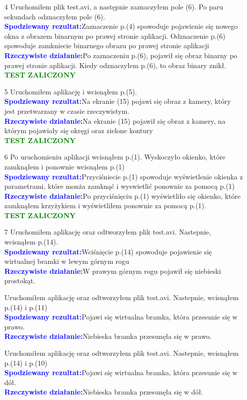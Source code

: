 \documentclass[11pt,a4paper]{article}
\newcommand{\testA}{\textcolor{blue}{\textbf{Spodziewany rezultat:\quad}}}
\newcommand{\testB}{\textcolor{blue}{\textbf{Rzeczywiste działanie:\quad}}}
\newcommand{\testT}{\textcolor{green}{\large{\textbf{TEST ZALICZONY}}}}
\newcommand{\testM}{\textcolor{purple}{\large{\textbf{TEST NIEJEDNOZNACZNY}}}}
\begin{document}
\begin{enumerate}
\testM

\item[4] Uruchomiłem plik test.avi, a następnie zaznaczyłem pole (6). Po paru sekundach odznaczyłem pole (6).\\
\testA Zaznaczenie p.(4) spowoduje pojawienie się nowego okna z obrazem binarnym po prawej stronie aplikacji. Odznaczenie p.(6) spowoduje zamkniecie binarnego obrazu po prawej stronie aplikacji\\
\testB Po zaznaczeniu p.(6), pojawił się obraz binarny po prawej stronie aplikacji. Kiedy odznaczyłem p.(6), to obraz binary znikł.\\
\testT
\item[5]  Uruchomiłem aplikację i wcisnąłem p.(5).\\
\testA Na ekranie (15) pojawi się obraz z kamery, który jest przetwarzany w czasie rzeczywistym.\\
\testB Na ekranie (15) pojawił się obraz z kamery, na którym pojawiały się okręgi oraz zielone kontury\\
\testT
\item[6] Po uruchomieniu aplikacji wcisnąłem p.(1). Wyskoczyło okienko, które zamknąłem i ponownie wcisnąłem p.(1)\\
\testA Przyciśniecie p.(1) spowoduje wyświetlenie okienka z parametrami, które monża zamknąć i wyswietlić ponownie za pomocą p.(1)\\
\testB Po przyciśnięciu p.(1) wyświetliło się okienko, które zamknąłem krzyżykiem i wyświetliłem ponownie za pomocą p.(1).\\
\testT
\item[7] Uruchomiłem aplikację oraz odtworzyłem plik test.avi. Nastepnie, wcisnąłem p.(14).\\
\testA Wciśnięcie p.(14) spowoduje pojawienie się wirtualnej bramki w lewym górnym rogu\\
\testB W prawym górnym rogu pojawił się niebieski prostokąt.

Uruchomiłem aplikację oraz odtworzyłem plik test.avi. Nastepnie, wcisnąłem p.(14) i p.(11)\\
\testA Pojawi się wirtualna bramka, która przesunie się w prawo.\\
\testB Niebieska bramka przesunęła się w prawo.

Uruchomiłem aplikację oraz odtworzyłem plik test.avi. Nastepnie, wcisnąłem p.(14) i p.(10)\\
\testA Pojawi się wirtualna bramka, która przesunie się w dół.\\
\testB Niebieska bramka przesunęła się w dół.


\end{enumerate}
\end{document}
